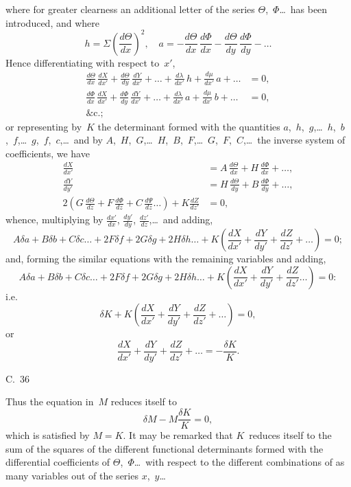 \documentclass[11pt,a4paper]{article}
\begin{document}
\newpage
where for greater clearness an additional letter of the series $\Theta$,~$\Phi$\ldots\ has been introduced, and where
\[
h = \Sigma\left(\frac{d\Theta}{dx}\right)^2, \quad
a = -\frac{d\Theta}{dx}\,\frac{d\Phi}{dx} - \frac{d\Theta}{dy}\,\frac{d\Phi}{dy} - \ldots
\]
Hence differentiating with respect to~$x'$,
\begin{align*}
\frac{d\Theta}{dx}\,\frac{dX}{dx'} + \frac{d\Theta}{dy}\,\frac{dY}{dx'} + \ldots + \frac{d\lambda}{dx'}\,h + \frac{d\mu}{dx'}\,a + \ldots &= 0,\\
\frac{d\Phi}{dx}\,\frac{dX}{dx'} + \frac{d\Phi}{dy}\,\frac{dY}{dx'} + \ldots + \frac{d\lambda}{dx'}\,a + \frac{d\mu}{dx'}\,b + \ldots &= 0,\\
\&\text{c.};
\end{align*}
or representing by~$K$ the determinant formed with the quantities $a$,~$h$,~$g$,\ldots\ $h$,~$b$,~$f$,\ldots\ $g$,~$f$,~$c$,\ldots\ and by $A$,~$H$,~$G$,\ldots\ $H$,~$B$,~$F$,\ldots\ $G$,~$F$,~$C$,\ldots\ the inverse system of coefficients, we have
\begin{align*}
\frac{dX}{dx'} &= A\,\frac{d\Theta}{dx} + H\,\frac{d\Phi}{dx} + \ldots,\\
\frac{dY}{dy'} &= H\,\frac{d\Theta}{dy} + B\,\frac{d\Phi}{dy} + \ldots,\\
2(G\,\frac{d\Theta}{dz} + F\,\frac{d\Phi}{dz} + C\,\frac{d\Psi}{dz}\ldots) + K\frac{dZ}{dz'} &= 0,
\end{align*}
whence, multiplying by $\frac{dx'}{dx}$, $\frac{dy'}{dy}$, $\frac{dz'}{dz}$,\ldots\ and adding,
\[
A\delta a + B\delta b + C\delta c\ldots + 2F\delta f + 2G\delta g + 2H\delta h\ldots + K\left(\frac{dX}{dx'} + \frac{dY}{dy'} + \frac{dZ}{dz'} + \ldots\right) = 0;
\]
and, forming the similar equations with the remaining variables and adding,
\[
A\delta a + B\delta b + C\delta c\ldots + 2F\delta f + 2G\delta g + 2H\delta h\ldots + K\left(\frac{dX}{dx'} + \frac{dY}{dy'} + \frac{dZ}{dz'}\ldots\right) = 0:
\]
i.e.
\[
\delta K + K\left(\frac{dX}{dx'} + \frac{dY}{dy'} + \frac{dZ}{dz'} + \ldots\right) = 0,
\]
or
\[
\frac{dX}{dx'} + \frac{dY}{dy'} + \frac{dZ}{dz'} + \ldots = -\frac{\delta K}{K}.
\]

\begin{center}
C.~36
\end{center}

\newpage
Thus the equation in~$M$ reduces itself to
\[
\delta M - M\frac{\delta K}{K} = 0,
\]
which is satisfied by $M = K$. It may be remarked that $K$~reduces itself to the sum of the squares of the different functional determinants formed with the differential coefficients of $\Theta$,~$\Phi$\ldots\ with respect to the different combinations of as many variables out of the series $x$,~$y$\ldots
\end{document}

